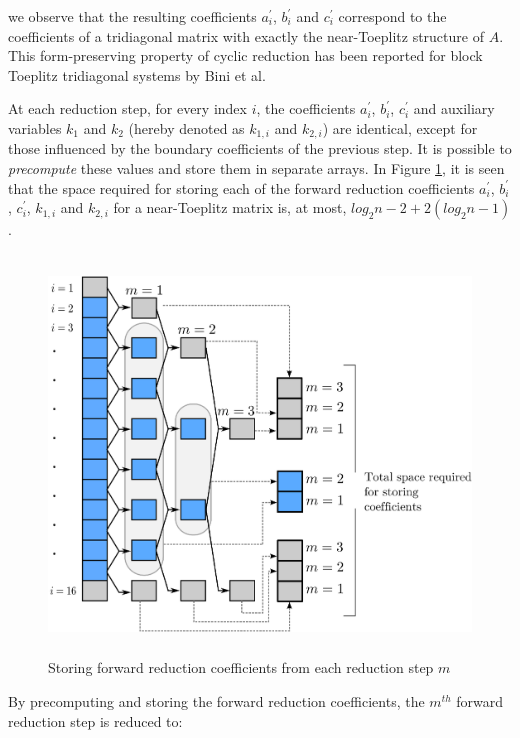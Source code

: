 \documentclass{elsarticle}
\begin{document}
we observe that the resulting coefficients
$a_i^\prime$, $b_i^\prime$ and $c_i^\prime$
correspond to the coefficients of a tridiagonal matrix with
exactly the near-Toeplitz structure of $A$.
This form-preserving property of cyclic reduction
has been reported for block Toeplitz tridiagonal systems
by Bini et al.

At each reduction step,
for every index $i$,
the coefficients $a_i^\prime$, $b_i^\prime$, $c_i^\prime$
and auxiliary variables $k_1$ and $k_2$
(hereby denoted as $k_{1,i}$ and $k_{2,i}$) are identical,
except for those influenced by the
boundary coefficients of the previous step.
It is possible to \emph{precompute} these values
and store them in separate arrays.
In Figure \ref{fig:cyclic-reduction-precomputing},
it is seen that the space required for storing each of the
forward reduction coefficients
$a_i^\prime$, $b_i^\prime$, $c_i^\prime$,
$k_{1,i}$ and $k_{2,i}$
for a near-Toeplitz matrix
is, at most, $log_2n-2 + 2(log_2n-1)$.

\begin{figure}[h!]
\begin{center}
\includegraphics[height=300pt]{img/cyclic-reduction-precomputing.eps}
\end{center}
\caption{Storing forward reduction coefficients
    from each reduction step $m$}
\label{fig:cyclic-reduction-precomputing}
\end{figure}

By precomputing and storing the forward reduction
coefficients,
the $m^{th}$ forward reduction step is reduced to:
\end{document}
